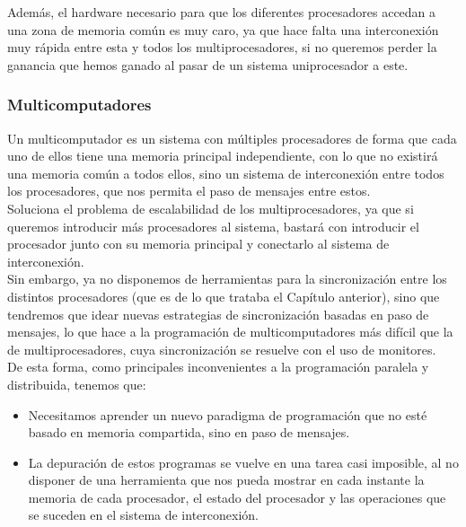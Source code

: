 Además, el hardware necesario para que los diferentes procesadores accedan a una zona de memoria común es muy caro, ya que hace falta una interconexión muy rápida entre esta y todos los multiprocesadores, si no queremos perder la ganancia que hemos ganado al pasar de un sistema uniprocesador a este.

\subsubsection{Multicomputadores}
Un multicomputador es un sistema con múltiples procesadores de forma que cada uno de ellos tiene una memoria principal independiente, con lo que no existirá una memoria común a todos ellos, sino un sistema de interconexión entre todos los procesadores, que nos permita el paso de mensajes entre estos.\\

Soluciona el problema de escalabilidad de los multiprocesadores, ya que si queremos introducir más procesadores al sistema, bastará con introducir el procesador junto con su memoria principal y conectarlo al sistema de interconexión.\\

Sin embargo, ya no disponemos de herramientas para la sincronización entre los distintos procesadores (que es de lo que trataba el Capítulo anterior), sino que tendremos que idear nuevas estrategias de sincronización basadas en paso de mensajes, lo que hace a la programación de multicomputadores más difícil que la de multiprocesadores, cuya sincronización se resuelve con el uso de monitores.\\

\noindent
De esta forma, como principales inconvenientes a la programación paralela y distribuida, tenemos que:
\begin{itemize}
    \item Necesitamos aprender un nuevo paradigma de programación que no esté basado en memoria compartida, sino en paso de mensajes.
    \item La depuración de estos programas se vuelve en una tarea casi imposible, al no disponer de una herramienta que nos pueda mostrar en cada instante la memoria de cada procesador, el estado del procesador y las operaciones que se suceden en el sistema de interconexión.
\end{itemize}

